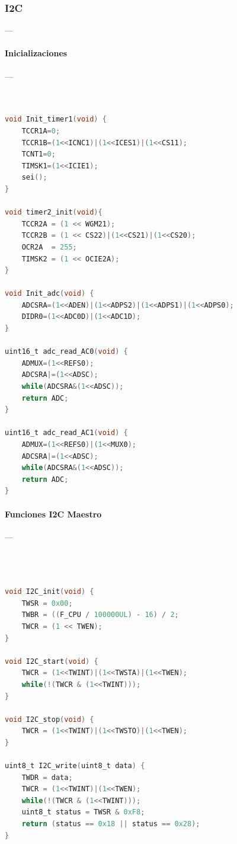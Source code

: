 \subsubsection{\textbf{I2C}} --- \\

\paragraph{Inicializaciones}\label{anexo:initsSPI}---
\begin{lstlisting}[language=C, caption={Inits en spi}]


void Init_timer1(void) {
	TCCR1A=0;
	TCCR1B=(1<<ICNC1)|(1<<ICES1)|(1<<CS11);
	TCNT1=0;
	TIMSK1=(1<<ICIE1);
	sei();
}

void timer2_init(void){
	TCCR2A = (1 << WGM21);
	TCCR2B = (1 << CS22)|(1<<CS21)|(1<<CS20);
	OCR2A  = 255;
	TIMSK2 = (1 << OCIE2A);
}

void Init_adc(void) {
	ADCSRA=(1<<ADEN)|(1<<ADPS2)|(1<<ADPS1)|(1<<ADPS0);
	DIDR0=(1<<ADC0D)|(1<<ADC1D);
}

uint16_t adc_read_AC0(void) {
	ADMUX=(1<<REFS0);
	ADCSRA|=(1<<ADSC);
	while(ADCSRA&(1<<ADSC));
	return ADC;
}

uint16_t adc_read_AC1(void) {
	ADMUX=(1<<REFS0)|(1<<MUX0);
	ADCSRA|=(1<<ADSC);
	while(ADCSRA&(1<<ADSC));
	return ADC;
}


\end{lstlisting}


\paragraph{Funciones I2C Maestro}\label{anexo:I2c}---
\begin{lstlisting}[language=C, caption={Funciones I2C}]



void I2C_init(void) {
	TWSR = 0x00;
	TWBR = ((F_CPU / 100000UL) - 16) / 2;
	TWCR = (1 << TWEN);
}

void I2C_start(void) {
	TWCR = (1<<TWINT)|(1<<TWSTA)|(1<<TWEN);
	while(!(TWCR & (1<<TWINT)));
}

void I2C_stop(void) {
	TWCR = (1<<TWINT)|(1<<TWSTO)|(1<<TWEN);
}

uint8_t I2C_write(uint8_t data) {
	TWDR = data;
	TWCR = (1<<TWINT)|(1<<TWEN);
	while(!(TWCR & (1<<TWINT)));
	uint8_t status = TWSR & 0xF8;
	return (status == 0x18 || status == 0x28);
}

\end{lstlisting}








